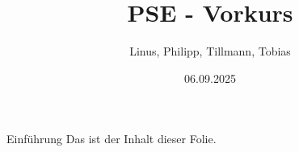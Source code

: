 \documentclass{../../presentation}
\title{PSE - Vorkurs}
\author{Linus, Philipp, Tillmann, Tobias}
\institute{FIUS - Fachgruppe Informatik Universität Stuttgart}
\date{06.09.2025}
\begin{document}
\begin{frame}
  \titlepage
\end{frame}

\begin{frame}{Einführung}
  Das ist der Inhalt dieser Folie.
\end{frame}
\end{document}
